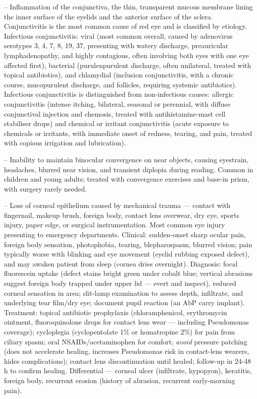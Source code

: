 -- Inflammation of the conjunctiva, the thin, transparent mucous membrane lining the inner surface of the eyelids and the anterior surface of the sclera. Conjunctivitis is the most common cause of red eye and is classified by etiology. Infectious conjunctivitis: viral (most common overall, caused by adenovirus serotypes 3, 4, 7, 8, 19, 37, presenting with watery discharge, preauricular lymphadenopathy, and highly contagious, often involving both eyes with one eye affected first), bacterial (purulenpurulent discharge, often unilateral, treated with topical antibiotics), and chlamydial (inclusion conjunctivitis, with a chronic course, mucopurulent discharge, and follicles, requiring systemic antibiotics). Infectious conjunctivitis is distinguished from non-infectious causes: allergic conjunctivitis (intense itching, bilateral, seasonal or perennial, with diffuse conjunctival injection and chemosis, treated with antihistamine-mast cell stabiliser drops) and chemical or irritant conjunctivitis (acute exposure to chemicals or irritants, with immediate onset of redness, tearing, and pain, treated with copious irrigation and lubrication).

-- Inability to maintain binocular convergence on near objects, causing eyestrain, headaches, blurred near vision, and transient diplopia during reading. Common in children and young adults; treated with convergence exercises and base-in prism, with surgery rarely needed.

-- Loss of corneal epithelium caused by mechanical trauma — contact with fingernail, makeup brush, foreign body, contact lens overwear, dry eye, sports injury, paper edge, or surgical instrumentation. Most common eye injury presenting to emergency departments. Clinical: sudden-onset sharp ocular pain, foreign body sensation, photophobia, tearing, blepharospasm, blurred vision; pain typically worse with blinking and eye movement (eyelid rubbing exposed defect), and may awaken patient from sleep (cornea dries overnight). Diagnosis: focal fluorescein uptake (defect stains bright green under cobalt blue; vertical abrasions suggest foreign body trapped under upper lid — evert and inspect), reduced corneal sensation in area; slit-lamp examination to assess depth, infiltrate, and underlying tear film/dry eye; document pupil reaction (an AbP carry implant). Treatment: topical antibiotic prophylaxis (chloramphenicol, erythromycin ointment, fluoroquinolone drops for contact lens wear — including Pseudomonas coverage); cycloplegia (cyclopentolate 1\% or homatropine 2\%) for pain from ciliary spasm; oral NSAIDs/acetaminophen for comfort; \emph{avoid} pressure patching (does not accelerate healing, increases Pseudomonas risk in contact-lens wearers, hides complications); contact lens discontinuation until healed; follow-up in 24-48 h to confirm healing. Differential — corneal ulcer (infiltrate, hypopyon), keratitis, foreign body, recurrent erosion (history of abrasion, recurrent early-morning pain).

